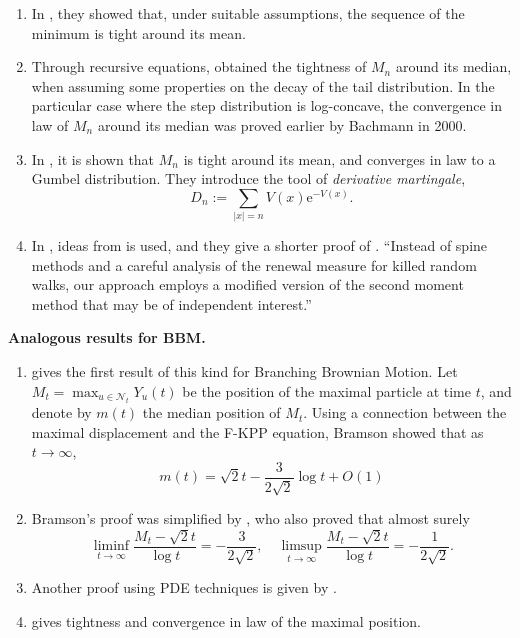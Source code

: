 \begin{enumerate}
    \item In \autocite{addario-berryMinimaBranching2009}, they showed that, under suitable assumptions, the sequence of the minimum is tight around its mean. 
    \item \autocite{aidekonConvergenceLaw2013} Through recursive equations, \cite{bramsonTightness2009} obtained the tightness of $M_n$ around its median, when assuming some properties on the decay of the tail distribution. In the particular case where the step distribution is log-concave, the convergence in law of $M_n$ around its median was proved earlier by Bachmann in 2000. 
    \item In \autocite{aidekonConvergenceLaw2013}, it is shown that $M_n$ is tight around its mean, and converges in law to a Gumbel distribution. 
    They introduce the tool of \textit{derivative martingale}, 
    \[
    D_n:=\sum_{|x|=n} V(x) \mathrm{e}^{-V(x)}.
    \]
    \item In \autocite{bramsonConvergenceLaw2016}, ideas from \autocite{bramsonConvergenceLaw2016a} is used, and they give a shorter proof of \autocite{aidekonConvergenceLaw2013}. ``Instead of spine methods and a careful analysis of the renewal measure for killed random walks, our approach
    employs a modified version of the second moment method that may be of independent interest.''


\end{enumerate}





\textbf{Analogous results for BBM.} 

\begin{enumerate}
    \item \cite{bramsonMaximalDisplacement1978} gives the first result of this kind for Branching Brownian Motion. 
    Let $M_t=\max _{u \in \mathcal{N}_t} Y_u(t)$ be the position of the maximal particle at time $t$, and denote by $m(t)$ the median position of $M_t$. Using a connection between the maximal displacement and the F-KPP equation, Bramson showed that as $t \rightarrow \infty$,
\[
    m(t)=\sqrt{2} t-\frac{3}{2 \sqrt{2}} \log t+O(1)
\]

    \item Bramson's proof was simplified by \autocite{robertsSimplePath2013}, who also proved that almost surely
\[
    \liminf _{t \rightarrow \infty} \frac{M_t-\sqrt{2} t}{\log t}=-\frac{3}{2 \sqrt{2}}, \quad \limsup _{t \rightarrow \infty} \frac{M_t-\sqrt{2} t}{\log t}=-\frac{1}{2 \sqrt{2}} .
\]
    \item Another proof using PDE techniques is given by \autocite{lauNonlinearDiffusion1985}.

    \item \autocite{lalleyConditionalLimit1987} gives tightness and convergence in law of the maximal position.
\end{enumerate}

